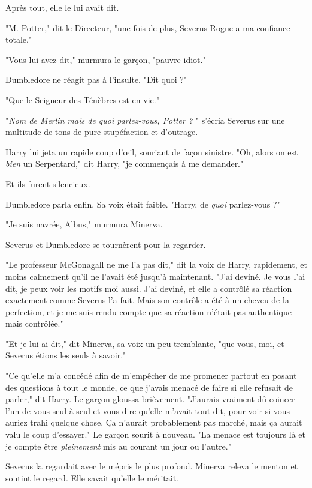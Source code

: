 Après tout, elle le lui avait dit.

"M. Potter," dit le Directeur, "une fois de plus, Severus Rogue a ma confiance totale."

"Vous lui avez dit," murmura le garçon, "pauvre idiot."

Dumbledore ne réagit pas à l'insulte. "Dit quoi ?"

"Que le Seigneur des Ténèbres est en vie."

"\emph{Nom de Merlin mais de quoi parlez-vous, Potter ?} " s'écria Severus sur une multitude de tons de pure stupéfaction et d'outrage.

Harry lui jeta un rapide coup d'œil, souriant de façon sinistre. "Oh, alors on est \emph{bien}  un Serpentard," dit Harry, "je commençais à me demander."

Et ils furent silencieux.

Dumbledore parla enfin. Sa voix était faible. "Harry, de \emph{quoi}  parlez-vous ?"

"Je suis navrée, Albus," murmura Minerva.

Severus et Dumbledore se tournèrent pour la regarder.

"Le professeur McGonagall ne me l'a pas dit," dit la voix de Harry, rapidement, et moins calmement qu'il ne l'avait été jusqu'à maintenant. "J'ai deviné. Je vous l'ai dit, je peux voir les motifs moi aussi. J'ai deviné, et elle a contrôlé sa réaction exactement comme Severus l'a fait. Mais son contrôle a été à un cheveu de la perfection, et je me suis rendu compte que sa réaction n'était pas authentique mais contrôlée."

"Et je lui ai dit," dit Minerva, sa voix un peu tremblante, "que vous, moi, et Severus étions les seuls à savoir."

"Ce qu'elle m'a concédé afin de m'empêcher de me promener partout en posant des questions à tout le monde, ce que j'avais menacé de faire si elle refusait de parler," dit Harry. Le garçon gloussa brièvement. "J'aurais vraiment dû coincer l'un de vous seul à seul et vous dire qu'elle m'avait tout dit, pour voir si vous auriez trahi quelque chose. Ça n'aurait probablement pas marché, mais ça aurait valu le coup d'essayer." Le garçon sourit à nouveau. "La menace est toujours là et je compte être \emph{pleinement}  mis au courant un jour ou l'autre."

Severus la regardait avec le mépris le plus profond. Minerva releva le menton et soutint le regard. Elle savait qu'elle le méritait.

